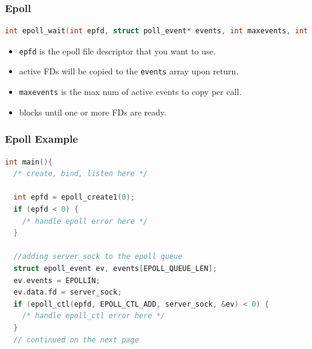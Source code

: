 \documentclass[aspectratio=43]{beamer}
\begin{document}
\begin{frame}[fragile]
  \frametitle{Epoll}
  
    \begin{lstlisting}[language=C++,basicstyle=\ttfamily\footnotesize,commentstyle=\color{commgreen},keywordstyle=\color{blue},breaklines=true]
int epoll_wait(int epfd, struct poll_event* events, int maxevents, int timeout);
\end{lstlisting}

\begin{itemize}
\item {\tt epfd} is the epoll file descriptor that you want to use.
\item active FDs will be copied to the {\tt events} array upon return.
\item {\tt maxevents} is the max num of active events to copy per call.
\item blocks until one or more FDs are ready.
\end{itemize}
\end{frame}

\begin{frame}[fragile]
  \frametitle{Epoll Example}
\begin{lstlisting}[language=C++,basicstyle=\ttfamily\footnotesize,commentstyle=\color{commgreen},keywordstyle=\color{blue},breaklines=true]
int main(){
  /* create, bind, listen here */
    
  int epfd = epoll_create1(0);
  if (epfd < 0) {
    /* handle epoll error here */
  }

  //adding server_sock to the epoll queue
  struct epoll_event ev, events[EPOLL_QUEUE_LEN];
  ev.events = EPOLLIN;
  ev.data.fd = server_sock;
  if (epoll_ctl(epfd, EPOLL_CTL_ADD, server_sock, &ev) < 0) {
    /* handle epoll_ctl error here */
  }
  // continued on the next page
  \end{lstlisting}
\end{frame}
\end{document}
